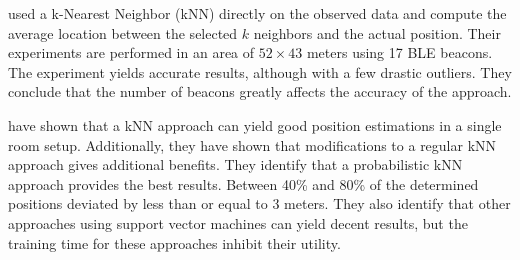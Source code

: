 \citeauthor{improving_indoor_localization} \cite{improving_indoor_localization} used a k-Nearest Neighbor (kNN) directly on the observed data and compute the average location between the selected $k$ neighbors and the actual position. 
Their experiments are performed in an area of $52\times43$ meters using 17 BLE beacons.
The experiment yields accurate results, although with a few drastic outliers. 
They conclude that the number of beacons greatly affects the accuracy of the approach.

\citeauthor{ble_kneares_neural}\cite{ble_kneares_neural} have shown that a kNN approach can yield good position estimations in a single room setup. 
Additionally, they have shown that modifications to a regular kNN approach gives additional benefits. 
They identify that a probabilistic kNN approach provides the best results. 
Between 40\% and 80\% of the determined positions deviated by less than or equal to 3 meters. 
They also identify that other approaches using support vector machines can yield decent results, but the training time for these approaches inhibit their utility.